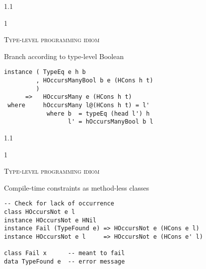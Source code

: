 \documentclass{slides}
\newcommand{\header}[1]{{\large\scshape \color{Red} #1} \medskip }
\newcommand{\blau}[1]{{\color{Blue} #1} \medskip }
\newenvironment{myslide}{\begin{slide}\color{Blue}\begin{boxedminipage}{1.1\hsize}\begin{boxedminipage}{1\hsize}\color{Black}
\vspace{-170\in}
}{%
\smallskip
\end{boxedminipage}
\end{boxedminipage}
\end{slide}}
\begin{document}
\begin{myslide}

\header{Type-level programming idiom}

\blau{Branch according to type-level Boolean}

\bigskip

\begin{Verbatim}[fontseries=normal,fontsize=\small]
instance ( TypeEq e h b
         , HOccursManyBool b e (HCons h t)
         )
      =>   HOccursMany e (HCons h t)
 where     hOccursMany l@(HCons h t) = l'
            where b  = typeEq (head l') h 
                  l' = hOccursManyBool b l
\end{Verbatim}

\end{myslide}






\begin{myslide}

\header{Type-level programming idiom}

\blau{Compile-time constraints as method-less classes}

\bigskip

\begin{Verbatim}[fontseries=normal,fontsize=\tiny]
-- Check for lack of occurrence
class HOccursNot e l
instance HOccursNot e HNil
instance Fail (TypeFound e) => HOccursNot e (HCons e l)
instance HOccursNot e l     => HOccursNot e (HCons e' l)

class Fail x      -- meant to fail
data TypeFound e  -- error message
\end{Verbatim}

\end{myslide}



\end{document}
